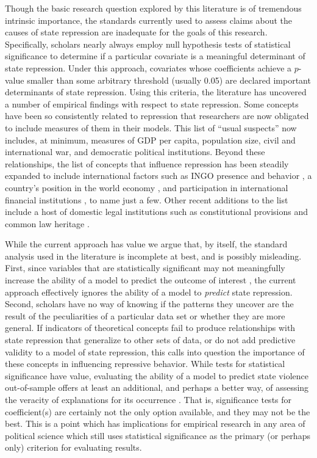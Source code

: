 \documentclass[12pt]{article}
\begin{document}
Though the basic research question explored by this literature is of tremendous intrinsic importance, the standards currently used to assess claims about the causes of state repression are inadequate for the goals of this research. Specifically, scholars nearly always employ null hypothesis tests of statistical significance to determine if a particular covariate is a meaningful determinant of state repression. Under this approach, covariates whose coefficients achieve a $p$-value smaller than some arbitrary threshold (usually 0.05) are declared important determinants of state repression. Using this criteria, the literature has uncovered a number of empirical findings with respect to state repression. Some concepts have been so consistently related to repression that researchers are now obligated to include measures of them in their models. This list of ``usual suspects'' now includes, at minimum, measures of GDP per capita, population size, civil and international war, and democratic political institutions. Beyond these relationships, the list of concepts that influence repression has been steadily expanded to include international factors such as INGO presence and behavior \citep{HafnerBurtonTsutsui2005, Franklin2008, MurdieDavis2012}, a country's position in the world economy \citep{HafnerBurton2005jpr}, and participation in international financial institutions \citep{AbouharbCingranelli2006, AbouharbCingranelli2007}, to name just a few. Other recent additions to the list include a host of domestic legal institutions such as constitutional provisions \citep{Cross1999, KeithTatePoe2009} and common law heritage \citep{Mitchell2013}. 

While the current approach has value we argue that, by itself, the standard analysis used in the literature is incomplete at best, and is possibly misleading. First, since variables that are statistically significant may not meaningfully increase the ability of a model to predict the outcome of interest \citep{Wardetal2010}, the current approach effectively ignores the ability of a model to {\em predict} state repression. Second, scholars have no way of knowing if the patterns they uncover are the result of the peculiarities of a particular data set or whether they are more general. If indicators of theoretical concepts fail to produce relationships with state repression that generalize to other sets of data, or do not add predictive validity to a model of state repression, this calls into question the importance of these concepts in influencing repressive behavior. While tests for statistical significance have value, evaluating the ability of a model to predict state violence out-of-sample offers at least an additional, and perhaps a better way, of assessing the veracity of explanations for its occurrence \citep[See, e.g.][]{BeckKingZeng2000}. That is, significance tests for coefficient(s) are certainly not the only option available, and they may not be the best. This is a point which has implications for empirical research in any area of political science which still uses statistical significance as the primary (or perhaps only) criterion for evaluating results.
\end{document}
